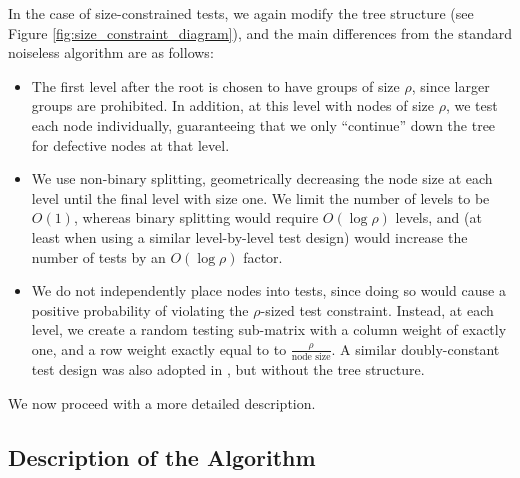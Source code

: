 In the case of size-constrained tests, we again modify the tree structure (see Figure \ref{fig:size_constraint_diagram}), and the main differences from the standard noiseless algorithm \cite{cher20,Eri20} are as follows:
\begin{itemize}
    \item The first level after the root is chosen to have groups of size $\rho$, since larger groups are prohibited.  In addition, at this level with nodes of size $\rho$, we test each node individually, guaranteeing that we only ``continue'' down the tree for defective nodes at that level.
    \item We use non-binary splitting, geometrically decreasing the node size at each level until the final level with size one.  We limit the number of levels to be $O(1)$, whereas binary splitting would require $O(\log \rho)$ levels, and (at least when using a similar level-by-level test design) would increase the number of tests by an $O(\log \rho)$  factor.
    \item We do not independently place nodes into tests, since doing so would cause a positive probability of violating the $\rho$-sized test constraint.  Instead, at each level, we create a random testing sub-matrix with a column weight of exactly one, and a row weight exactly equal to to $\frac{\rho}{\text{node~size}}$. A similar doubly-constant test design was also adopted in \cite{Ven19}, but without the tree structure.
\end{itemize}
We now proceed with a more detailed description.

\subsection{Description of the Algorithm} \label{sec:rho_algo_descrip}

